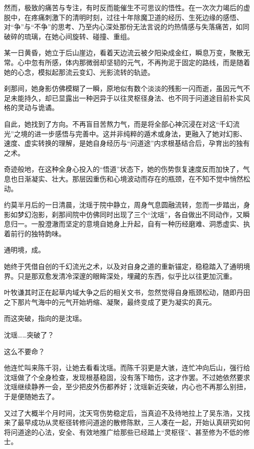 然而，极致的痛苦与专注，有时反而能催生不可思议的悟性。在一次次力竭后的虚脱中，在疼痛刺激下的清明时刻，过往十年除魔卫道的经历、生死边缘的感悟、对“争”与“不争”的思考、乃至内心深处那份无法言说的灼热情感与失落痛苦，如同破碎的琉璃，在她心间旋转、碰撞、重组。

某一日黄昏，她立于后山崖边，看着天边流云被夕阳染成金红，瞬息万变，聚散无常。心中忽有所感，体内那微弱却坚韧的元气，不再拘泥于固定的路线，而是随着她的心念，模拟起那流云变幻、光影流转的轨迹。

刹那间，她身影仿佛模糊了一瞬，原地似有数个淡淡的残影一闪而逝，虽因元气不足未能持久，却已显露出一种迥异于以往灵枢径身法、也不同于问道途目前朴实风格的灵动与诡谲。

自此，她找到了方向。不再盲目苦熬力气，而是将全部心神沉浸在对这“千幻流光”之境的进一步感悟与完善中。这并非纯粹的遁术或身法，更融入了她对幻影、速度、虚实转换的理解，是她自身经历与“问道途”内求根基结合后，孕育出的独有之术。

奇迹般地，在这种全身心投入的“悟道”状态下，她的伤势恢复速度反而加快了，气息也日渐凝实、壮大。那层因重伤和心境波动而存在的瓶颈，在不知不觉中悄然松动。

约莫半月后的一日清晨，沈瑶于院中静立，周身气息圆融流转，忽而一步踏出，身影如梦幻泡影，刹那间院中仿佛同时出现了三个“沈瑶”，各自做出不同动作，又瞬息归一。一股澄澈而坚定的意境自她身上升起，自有一种历经磨难、洞悉虚实、执着前行的独特韵味。

通明境，成。

她终于凭借自创的千幻流光之术，以及对自身之道的重新锚定，稳稳踏入了通明境界。只是那双愈发清冷深邃的眼眸深处，埋藏的东西，似乎比以往更加沉重。

叶牧谦其时正在起草内域大争之后的相关文书，忽然觉得自身瓶颈松动，随即丹田之下那片气海中的元气开始坍缩、凝聚，最终变成了更为凝实的真元。

而这突破，指向的是沈瑶。

沈瑶……突破了？

这么不要命？

他连忙叫来陈千羽，让她去看看沈瑶。而陈千羽更是大骇，连忙冲向后山，强行给沈瑶做了个全身检查，发现根基稳固，没有落下暗伤，这才作罢。不过她依然要求沈瑶继续静养一会，至少把皮外伤都养好；沈瑶新近突破，内心也不再那么别扭，于是便随她去了。

\vspace{2em}

又过了大概半个月时间，沈天穹伤势稳定后，当真迫不及待地拉上了吴东浩，又找来了最早成功从灵枢径转修问道途的散修陈默，三人凑在一起，开始认真研究如何将问道途的心法，安全、有效地推广给那些已经踏上“灵枢径”、甚至修为不低的修士。

